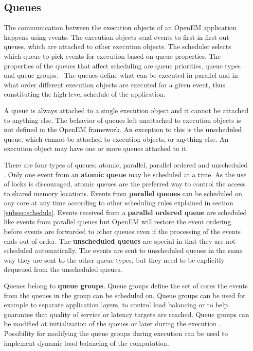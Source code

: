 \subsection{Queues}
\label{subsec:queues}
The communication between the execution objects of an OpenEM application happens using events. The execution objects send events to first in first out queues, which are attached to other execution objects. The scheduler selects which queue to pick events for execution based on queue properties. The properties of the queues that affect scheduling are queue priorities, queue types and queue groups.~\cite{openemintro} The queues define what can be executed in parallel and in what order different execution objects are executed for a given event, thus constituting the high-level schedule of the application.

A queue is always attached to a single execution object and it cannot be attached to anything else. The behavior of queues left unattached to execution objects is not defined in the OpenEM framework. An exception to this is the unscheduled queue, which cannot be attached to execution objects, or anything else. An execution object may have one or more queues attached to it.~\cite{openemintro}

There are four types of queues: atomic, parallel, parallel ordered and unscheduled \cite{openemintro}. Only one event from an \textbf{atomic queue} may be scheduled at a time. As the use of locks is discouraged, atomic queues are the preferred way to control the access to shared memory locations. Events from \textbf{parallel queues} can be scheduled on any core at any time according to other scheduling rules explained in section \ref{subsec:schedule}. Events received from a \textbf{parallel ordered queue} are scheduled like events from parallel queues but OpenEM will restore the event ordering before events are forwarded to other queues even if the processing of the events ends out of order. The \textbf{unscheduled queues} are special in that they are not scheduled automatically. The events are sent to unscheduled queues in the same way they are sent to the other queue types, but they need to be explicitly dequeued from the unscheduled queues.~\cite{openempage}

Queues belong to \textbf{queue groups}. Queue groups define the set of cores the events from the queues in the group can be scheduled on. Queue groups can be used for example to separate application layers, to control load balancing or to help guarantee that quality of service or latency targets are reached. \cite{openemintro} Queue groups can be modified at initialization of the queues or later during the execution \cite{openempage}. Possibility for modifying the queue groups during execution can be used to implement dynamic load balancing of the computation.

